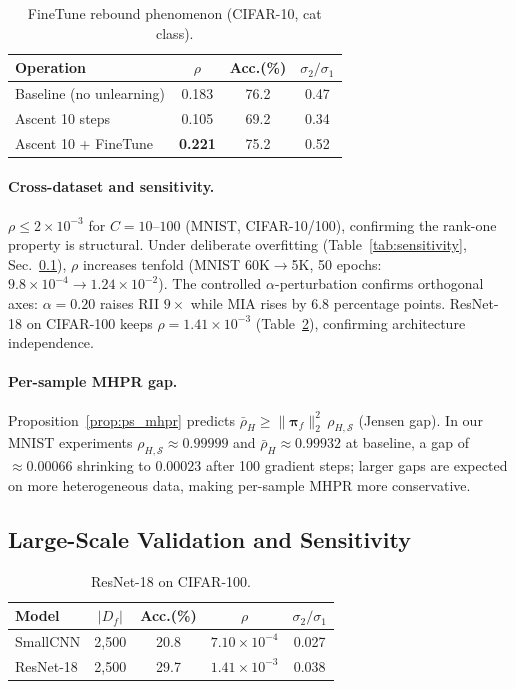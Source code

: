 \documentclass[smallextended]{svjour3}       %
\begin{document}
\begin{table}[t]
\centering
\small
\caption{FineTune rebound phenomenon (CIFAR-10, cat class).}\label{tab:rebound}
\setlength{\tabcolsep}{2pt}
\begin{tabular}{l c c c}
\toprule
Operation & $\rho$ & Acc.(\%) & $\sigma_2/\sigma_1$ \\
\midrule
Baseline (no unlearning) & 0.183 & 76.2 & 0.47 \\
Ascent 10 steps & 0.105 & 69.2 & 0.34 \\
Ascent 10 + FineTune & \textbf{0.221} & 75.2 & 0.52 \\
\bottomrule
\end{tabular}
\end{table}

\paragraph{Cross-dataset and sensitivity.} $\rho\le2\times10^{-3}$ for $C{=}10$--$100$ (MNIST, CIFAR-10/100), confirming the rank-one property is structural. Under deliberate overfitting (Table~\ref{tab:sensitivity}, Sec.~\ref{sec:sensitivity}), $\rho$ increases tenfold (MNIST 60K$\to$5K, 50 epochs: $9.8\times10^{-4}\to1.24\times10^{-2}$). The controlled $\alpha$-perturbation confirms orthogonal axes: $\alpha{=}0.20$ raises RII $9\times$ while MIA rises by $6.8$ percentage points. ResNet-18 on CIFAR-100 keeps $\rho{=}1.41\times10^{-3}$ (Table~\ref{tab:resnet18}), confirming architecture independence.

\paragraph{Per-sample MHPR gap.} Proposition~\ref{prop:ps_mhpr} predicts $\bar{\rho}_H \ge \|\boldsymbol{\pi}_f\|_2^2\,\rho_{H,\mathcal{S}}$ (Jensen gap). In our MNIST experiments $\rho_{H,\mathcal{S}}{\approx}0.99999$ and $\bar{\rho}_H{\approx}0.99932$ at baseline, a gap of ${\approx}0.00066$ shrinking to $0.00023$ after 100 gradient steps; larger gaps are expected on more heterogeneous data, making per-sample MHPR more conservative.

\subsection{Large-Scale Validation and Sensitivity}
\label{sec:sensitivity}

\begin{table}[t]
\centering
\small
\caption{ResNet-18 on CIFAR-100.}\label{tab:resnet18}
\setlength{\tabcolsep}{3pt}
\begin{tabular}{l c c c c}
\toprule
Model & $|D_f|$ & Acc.(\%) & $\rho$ & $\sigma_2/\sigma_1$ \\
\midrule
SmallCNN & 2,500 & 20.8 & $7.10{\times}10^{-4}$ & 0.027 \\
ResNet-18 & 2,500 & 29.7 & $1.41{\times}10^{-3}$ & 0.038 \\
\bottomrule
\end{tabular}
\end{table}
\end{document}
